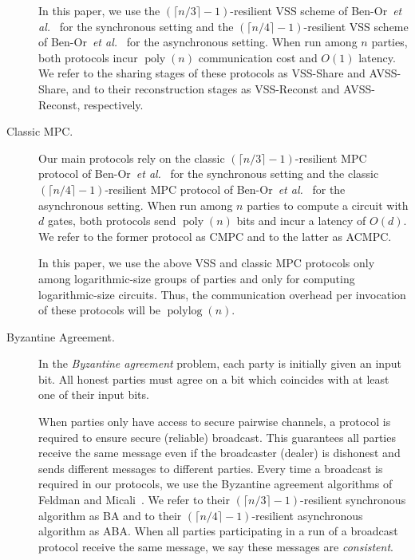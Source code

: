 \documentclass[11pt,letter]{article}
\newcommand{\etal}{\emph{et al.}}
\newcommand{\alg}[1]{\mbox{\textsf{#1}}}
\DeclareMathOperator{\polylog}{polylog}
\DeclareMathOperator{\poly}{poly}
\theoremstyle{mytheoremstyle}
\begin{document}
\begin{description}
	In this paper, we use the $(\lceil n/3 \rceil - 1)$-resilient VSS scheme of Ben-Or~\etal~\cite{bgw88} for the synchronous setting and the $(\lceil n/4 \rceil - 1)$-resilient VSS scheme of Ben-Or~\etal~\cite{benor_canetti_goldreich:asynchronous} for the asynchronous setting. When run among $n$ parties, both protocols incur $\poly(n)$ communication cost and $O(1)$ latency. We refer to the sharing stages of these protocols as \alg{VSS-Share} and \alg{AVSS-Share}, and to their reconstruction stages as \alg{VSS-Reconst} and \alg{AVSS-Reconst}, respectively.
	
	\item[Classic MPC.]
	Our main protocols rely on the classic $(\lceil n/3 \rceil - 1)$-resilient MPC protocol of Ben-Or~\etal~\cite{bgw88} for the synchronous setting and the classic $(\lceil n/4 \rceil - 1)$-resilient MPC protocol of Ben-Or~\etal~\cite{benor_canetti_goldreich:asynchronous} for the asynchronous setting. When run among $n$ parties to compute a circuit with $d$ gates, both protocols send $\poly(n)$ bits and incur a latency of $O(d)$. We refer to the former protocol as \alg{CMPC} and to the latter as \alg{ACMPC}.
	
	In this paper, we use the above VSS and classic MPC protocols only among logarithmic-size groups of parties and only for computing logarithmic-size circuits. Thus, the communication overhead per invocation of these protocols will be $\polylog(n)$. 

	\item[Byzantine Agreement.]
	In the \emph{Byzantine agreement} problem, each party is initially given an input bit. All honest parties must agree on a bit which coincides with at least one of their input bits. 
	
	When parties only have access to secure pairwise channels, a protocol is required to ensure secure (reliable) broadcast. This guarantees all parties receive the same message even if the broadcaster (dealer) is dishonest and sends different messages to different parties. Every time a broadcast is required in our protocols, we use the Byzantine agreement algorithms of Feldman and Micali~\cite{Feldman:1988:OAB:62212.62225}. We refer to their $(\lceil n/3 \rceil - 1)$-resilient synchronous algorithm as \alg{BA} and to their $(\lceil n/4 \rceil - 1)$-resilient asynchronous algorithm as \alg{ABA}. When all parties participating in a run of a broadcast protocol receive the same message, we say these messages are \emph{consistent}.
\end{description}
\end{document}
